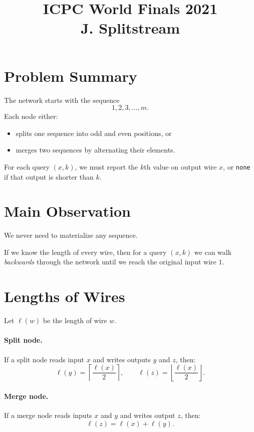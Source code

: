 \documentclass[11pt]{article}
\title{ICPC World Finals 2021\\J. Splitstream}
\author{}
\date{}
\begin{document}
\maketitle

\section*{Problem Summary}

The network starts with the sequence
\[
    1,2,3,\dots,m.
\]
Each node either:
\begin{itemize}[leftmargin=*]
    \item splits one sequence into odd and even positions, or
    \item merges two sequences by alternating their elements.
\end{itemize}

For each query $(x,k)$, we must report the $k$th value on output wire $x$, or \texttt{none} if that
output is shorter than $k$.

\section*{Main Observation}

We never need to materialize any sequence.

If we know the length of every wire, then for a query $(x,k)$ we can walk \emph{backwards} through the
network until we reach the original input wire $1$.

\section*{Lengths of Wires}

Let $\ell(w)$ be the length of wire $w$.

\paragraph{Split node.}
If a split node reads input $x$ and writes outputs $y$ and $z$, then:
\[
    \ell(y)=\left\lceil\frac{\ell(x)}{2}\right\rceil,
    \qquad
    \ell(z)=\left\lfloor\frac{\ell(x)}{2}\right\rfloor.
\]

\paragraph{Merge node.}
If a merge node reads inputs $x$ and $y$ and writes output $z$, then:
\[
    \ell(z)=\ell(x)+\ell(y).
\]
\end{document}
